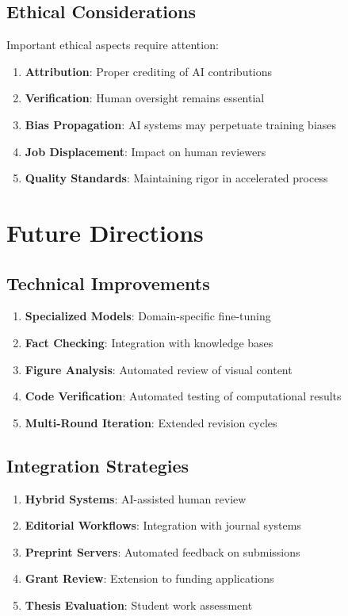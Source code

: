 \documentclass[11pt,a4paper]{article}
\begin{document}
\subsection{Ethical Considerations}

Important ethical aspects require attention:

\begin{enumerate}
    \item \textbf{Attribution}: Proper crediting of AI contributions
    \item \textbf{Verification}: Human oversight remains essential
    \item \textbf{Bias Propagation}: AI systems may perpetuate training biases
    \item \textbf{Job Displacement}: Impact on human reviewers
    \item \textbf{Quality Standards}: Maintaining rigor in accelerated process
\end{enumerate}

\section{Future Directions}

\subsection{Technical Improvements}

\begin{enumerate}
    \item \textbf{Specialized Models}: Domain-specific fine-tuning
    \item \textbf{Fact Checking}: Integration with knowledge bases
    \item \textbf{Figure Analysis}: Automated review of visual content
    \item \textbf{Code Verification}: Automated testing of computational results
    \item \textbf{Multi-Round Iteration}: Extended revision cycles
\end{enumerate}

\subsection{Integration Strategies}

\begin{enumerate}
    \item \textbf{Hybrid Systems}: AI-assisted human review
    \item \textbf{Editorial Workflows}: Integration with journal systems
    \item \textbf{Preprint Servers}: Automated feedback on submissions
    \item \textbf{Grant Review}: Extension to funding applications
    \item \textbf{Thesis Evaluation}: Student work assessment
\end{enumerate}
\end{document}
